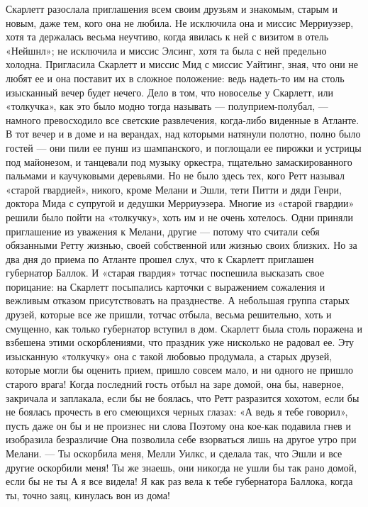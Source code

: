 Скарлетт разослала приглашения всем своим друзьям и знакомым, старым и новым, даже тем, кого она не любила. Не исключила она и миссис Мерриуэзер, хотя та держалась весьма неучтиво, когда явилась к ней с визитом в отель «Нейшнл»; не исключила и миссис Элсинг, хотя та была с ней предельно холодна. Пригласила Скарлетт и миссис Мид с миссис Уайтинг, зная, что они не любят ее и она поставит их в сложное положение: ведь надеть-то им на столь изысканный вечер будет нечего. Дело в том, что новоселье у Скарлетт, или «толкучка», как это было модно тогда называть — полуприем-полубал, — намного превосходило все светские развлечения, когда-либо виденные в Атланте.
В тот вечер и в доме и на верандах, над которыми натянули полотно, полно было гостей — они пили ее пунш из шампанского, и поглощали ее пирожки и устрицы под майонезом, и танцевали под музыку оркестра, тщательно замаскированного пальмами и каучуковыми деревьями. Но не было здесь тех, кого Ретт называл «старой гвардией», никого, кроме Мелани и Эшли, тети Питти и дяди Генри, доктора Мида с супругой и дедушки Мерриуэзера.
Многие из «старой гвардии» решили было пойти на «толкучку», хоть им и не очень хотелось. Одни приняли приглашение из уважения к Мелани, другие — потому что считали себя обязанными Ретту жизнью, своей собственной или жизнью своих близких. Но за два дня до приема по Атланте прошел слух, что к Скарлетт приглашен губернатор Баллок. И «старая гвардия» тотчас поспешила высказать свое порицание: на Скарлетт посыпались карточки с выражением сожаления и вежливым отказом присутствовать на празднестве. А небольшая группа старых друзей, которые все же пришли, тотчас отбыла, весьма решительно, хоть и смущенно, как только губернатор вступил в дом.
Скарлетт была столь поражена и взбешена этими оскорблениями, что праздник уже нисколько не радовал ее. Эту изысканную «толкучку» она с такой любовью продумала, а старых друзей, которые могли бы оценить прием, пришло совсем мало, и ни одного не пришло старого врага! Когда последний гость отбыл на заре домой, она бы, наверное, закричала и заплакала, если бы не боялась, что Ретт разразится хохотом, если бы не боялась прочесть в его смеющихся черных глазах: «А ведь я тебе говорил», пусть даже он бы и не произнес ни слова Поэтому она кое-как подавила гнев и изобразила безразличие Она позволила себе взорваться лишь на другое утро при Мелани.
— Ты оскорбила меня, Мелли Уилкс, и сделала так, что Эшли и все другие оскорбили меня! Ты же знаешь, они никогда не ушли бы так рано домой, если бы не ты А я все видела! Я как раз вела к тебе губернатора Баллока, когда ты, точно заяц, кинулась вон из дома!
